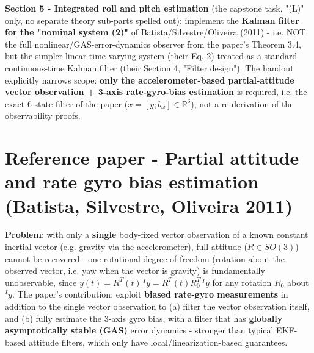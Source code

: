 \documentclass[11pt]{article}
\begin{document}
\textbf{Section 5 - Integrated roll and pitch estimation} (the capstone task, "(L)" only, no separate theory sub-parts spelled out): implement the \textbf{Kalman filter for the "nominal system (2)"} of Batista/Silvestre/Oliveira (2011) - i.e. NOT the full nonlinear/GAS-error-dynamics observer from the paper's Theorem 3.4, but the simpler linear time-varying system (their Eq. 2) treated as a standard continuous-time Kalman filter (their Section 4, "Filter design"). The handout explicitly narrows scope: \textbf{only the accelerometer-based partial-attitude vector observation + 3-axis rate-gyro-bias estimation} is required, i.e. the exact 6-state filter of the paper ($x = [y; b_\omega] \in \mathbb{R}^6$), not a re-derivation of the observability proofs.

\section{Reference paper - Partial attitude and rate gyro bias estimation (Batista, Silvestre, Oliveira 2011)}

\textbf{Problem}: with only a \textbf{single} body-fixed vector observation of a known constant inertial vector (e.g. gravity via the accelerometer), full attitude ($R \in SO(3)$) cannot be recovered - one rotational degree of freedom (rotation about the observed vector, i.e. yaw when the vector is gravity) is fundamentally unobservable, since $y(t) = R^T(t)\, {}^Iy = R^T(t)R_0^T\, {}^Iy$ for any rotation $R_0$ about ${}^Iy$. The paper's contribution: exploit \textbf{biased rate-gyro measurements} in addition to the single vector observation to (a) filter the vector observation itself, and (b) fully estimate the 3-axis gyro bias, with a filter that has \textbf{globally asymptotically stable (GAS)} error dynamics - stronger than typical EKF-based attitude filters, which only have local/linearization-based guarantees.
\end{document}

